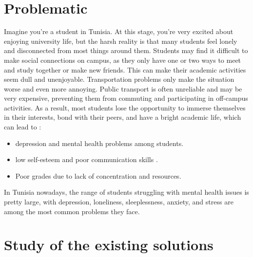 \section{Problematic}
Imagine you're a student in Tunisia. At this stage, you're very excited about enjoying university life, but the harsh reality is that many students feel lonely and disconnected from most things around them. Students may find it difficult to make social connections on campus, as they only have one or two ways to meet and study together or make new friends. This can make their academic activities seem dull and unenjoyable. Transportation problems only make the situation worse and even more annoying. Public transport is often unreliable and may be very expensive, preventing them from commuting and participating in off-campus activities. As a result, most students lose the opportunity to immerse themselves in their interests, bond with their peers, and have a bright academic life, which can lead to :

\begin{itemize}

    \item depression and mental health problems among students.
    \item low self-esteem and poor communication skills .
    \item Poor grades due to lack of concentration and resources.
\end{itemize}

In Tunisia nowadays, the range of students struggling with mental health issues is pretty large, with depression, loneliness, sleeplessness, anxiety, and stress are among the most common problems they face.
\cite{depression_among_tunisian_students}


\section{Study of the existing solutions}

